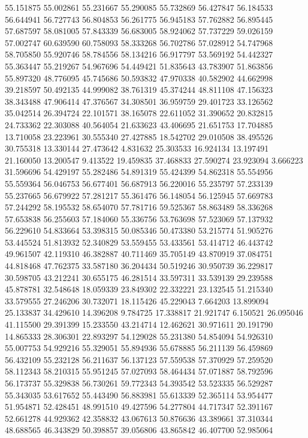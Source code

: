 55.151875
55.002861
55.231667
55.290085
55.732869
56.427847
56.184533
56.644941
56.727743
56.804853
56.261775
56.945183
57.762882
56.895445
57.687597
58.081005
57.843339
56.683005
58.924062
57.737229
59.026159
57.002747
60.639590
60.758093
58.333268
56.702786
57.028912
54.747968
58.705850
55.920746
58.784556
58.134216
56.917797
53.569192
54.442327
55.363447
55.219267
54.967696
54.449421
51.835643
43.783907
51.863856
55.897320
48.776095
45.745686
50.593832
47.970338
40.582902
44.662998
39.218597
50.492135
44.999082
38.761319
45.374244
48.811108
47.156323
38.343488
47.906414
47.376567
34.308501
36.959759
29.401723
33.126562
35.042514
26.394724
22.101571
38.165078
22.611052
31.390652
20.832815
24.733362
22.303088
40.564054
21.633623
43.406695
21.651753
17.704885
13.710058
23.223961
30.555340
27.427885
18.542702
29.010508
38.495526
30.755318
13.330144
27.473642
4.831632
25.303533
16.924134
13.197491
21.160050
13.200547
9.413522
19.459835
37.468833
27.590274
23.923094
3.666223
31.596696
54.429197
55.282486
54.891319
55.424399
54.862318
55.554956
55.559364
56.046753
56.677401
56.687913
56.220016
55.235797
57.233139
55.237665
56.679922
57.281217
55.361476
56.148054
56.125945
57.669783
57.244292
58.195532
58.654070
57.781716
59.525367
58.863489
58.336268
57.653838
56.255603
57.184060
55.336756
53.763698
57.523069
57.137932
56.229610
54.833664
53.398315
50.085346
50.473380
53.215774
51.905276
53.445524
51.813932
52.340829
53.559455
53.433561
53.414712
46.443742
49.961507
42.119310
46.382887
40.711469
35.705149
43.870919
37.084751
44.818468
47.762375
33.587180
36.204434
50.519246
30.950739
36.229817
30.598705
43.212241
30.655175
46.281514
33.597311
33.539139
29.239588
45.878781
32.548648
18.059339
23.849302
22.332221
23.132545
51.215340
33.579555
27.246206
30.732071
18.115426
45.229043
7.664203
13.899094
25.133837
34.429610
14.396208
9.784725
17.338817
21.921747
6.150521
26.095046
41.115500
29.391399
15.233550
43.214714
12.462621
30.971611
20.191790
14.865333
28.306301
22.893297
54.129028
55.231380
54.854094
54.926310
55.007753
54.929216
55.329051
55.894936
55.678885
56.211139
56.459869
56.432109
55.232128
56.211637
56.137123
57.559538
57.370929
57.259520
58.112343
58.210315
55.951245
57.027093
58.464434
57.071887
58.792596
56.173737
55.329838
56.730261
59.772343
54.393542
53.523335
56.529287
55.343035
53.617652
55.443490
56.883981
55.613339
52.365114
53.954477
51.954871
52.428451
48.991510
49.427596
54.277804
44.717347
52.391167
52.661278
44.929362
42.358832
43.067613
50.876636
43.389661
37.310344
48.688565
46.343829
50.398857
39.056806
43.865842
46.407700
52.985064
